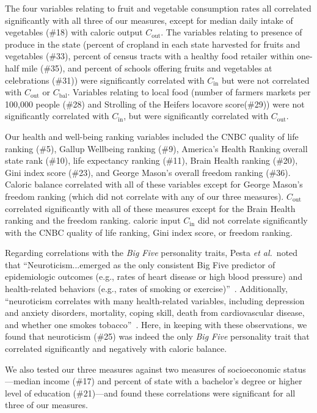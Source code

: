 \documentclass[10pt]{article}
\newcommand{\etal}{\textit{et al.}}
\newcommand{\calin}{C_{\textrm{in}}}
\newcommand{\calout}{C_{\textrm{out}}}
\newcommand{\calbal}{C_{\textrm{bal}}}
\begin{document}
The four variables relating to fruit and vegetable consumption rates
all correlated significantly with all three of our measures, except
for median daily intake of vegetables (\#18) with caloric output $\calout$.
The variables relating to presence of produce in the state (percent of
cropland in each state harvested for fruits and vegetables (\#33),
percent of census tracts with a healthy food retailer within one-half
mile (\#35), and percent of schools offering fruits and vegetables at
celebrations (\#31)) were significantly correlated with $\calin$
but were not correlated with $\calout$ or $\calbal$.
Variables relating to local food (number of farmers markets per
100,000 people (\#28) and Strolling of the Heifers locavore
score(\#29)) were not significantly correlated with $\calin$,
but were significantly correlated with $\calout$.

Our health and well-being ranking variables included 
the CNBC quality of life ranking (\#5), 
Gallup Wellbeing ranking (\#9), 
America's Health Ranking overall state rank (\#10), 
life expectancy ranking (\#11), 
Brain Health ranking (\#20), 
Gini index score (\#23), and
George Mason's overall freedom ranking (\#36).  
Caloric balance
correlated with all of these variables except for George Mason's
freedom ranking (which did not correlate with any of our three
measures).  $\calout$ correlated significantly with all of these
measures except for the Brain Health ranking and the freedom ranking.
caloric input $\calin$ did not correlate significantly with the CNBC quality
of life ranking, Gini index score, or freedom ranking.

Regarding correlations with the \textit{Big Five} personality traits,
Pesta \etal\ noted that ``Neuroticism...emerged as the only
consistent Big Five predictor of epidemiologic outcomes (e.g., rates
of heart disease or high blood pressure) and health-related behaviors
(e.g., rates of smoking or exercise)''~\cite{pesta}.  
Additionally,
``neuroticism correlates with many health-related variables, including
depression and anxiety disorders, mortality, coping skill, death from
cardiovascular disease, and whether one smokes tobacco''~\cite{pesta}.
Here, in keeping with these observations, we found that neuroticism
(\#25) was 
indeed the only \textit{Big Five}
personality trait that correlated significantly and negatively 
with caloric balance.

We also tested our three measures against two measures of
socioeconomic status---median income (\#17) and percent of state with a
bachelor's degree or higher level of education (\#21)---and found
these correlations were significant for all three of our measures.
\end{document}
